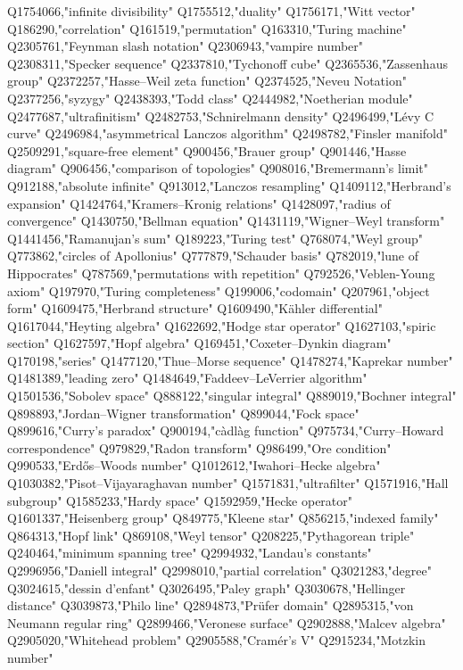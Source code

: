 Q1754066,"infinite divisibility"
Q1755512,"duality"
Q1756171,"Witt vector"
Q186290,"correlation"
Q161519,"permutation"
Q163310,"Turing machine"
Q2305761,"Feynman slash notation"
Q2306943,"vampire number"
Q2308311,"Specker sequence"
Q2337810,"Tychonoff cube"
Q2365536,"Zassenhaus group"
Q2372257,"Hasse–Weil zeta function"
Q2374525,"Neveu Notation"
Q2377256,"syzygy"
Q2438393,"Todd class"
Q2444982,"Noetherian module"
Q2477687,"ultrafinitism"
Q2482753,"Schnirelmann density"
Q2496499,"Lévy C curve"
Q2496984,"asymmetrical Lanczos algorithm"
Q2498782,"Finsler manifold"
Q2509291,"square-free element"
Q900456,"Brauer group"
Q901446,"Hasse diagram"
Q906456,"comparison of topologies"
Q908016,"Bremermann's limit"
Q912188,"absolute infinite"
Q913012,"Lanczos resampling"
Q1409112,"Herbrand's expansion"
Q1424764,"Kramers–Kronig relations"
Q1428097,"radius of convergence"
Q1430750,"Bellman equation"
Q1431119,"Wigner–Weyl transform"
Q1441456,"Ramanujan's sum"
Q189223,"Turing test"
Q768074,"Weyl group"
Q773862,"circles of Apollonius"
Q777879,"Schauder basis"
Q782019,"lune of Hippocrates"
Q787569,"permutations with repetition"
Q792526,"Veblen-Young axiom"
Q197970,"Turing completeness"
Q199006,"codomain"
Q207961,"object form"
Q1609475,"Herbrand structure"
Q1609490,"Kähler differential"
Q1617044,"Heyting algebra"
Q1622692,"Hodge star operator"
Q1627103,"spiric section"
Q1627597,"Hopf algebra"
Q169451,"Coxeter–Dynkin diagram"
Q170198,"series"
Q1477120,"Thue–Morse sequence"
Q1478274,"Kaprekar number"
Q1481389,"leading zero"
Q1484649,"Faddeev–LeVerrier algorithm"
Q1501536,"Sobolev space"
Q888122,"singular integral"
Q889019,"Bochner integral"
Q898893,"Jordan–Wigner transformation"
Q899044,"Fock space"
Q899616,"Curry's paradox"
Q900194,"càdlàg function"
Q975734,"Curry–Howard correspondence"
Q979829,"Radon transform"
Q986499,"Ore condition"
Q990533,"Erdős–Woods number"
Q1012612,"Iwahori–Hecke algebra"
Q1030382,"Pisot–Vijayaraghavan number"
Q1571831,"ultrafilter"
Q1571916,"Hall subgroup"
Q1585233,"Hardy space"
Q1592959,"Hecke operator"
Q1601337,"Heisenberg group"
Q849775,"Kleene star"
Q856215,"indexed family"
Q864313,"Hopf link"
Q869108,"Weyl tensor"
Q208225,"Pythagorean triple"
Q240464,"minimum spanning tree"
Q2994932,"Landau's constants"
Q2996956,"Daniell integral"
Q2998010,"partial correlation"
Q3021283,"degree"
Q3024615,"dessin d'enfant"
Q3026495,"Paley graph"
Q3030678,"Hellinger distance"
Q3039873,"Philo line"
Q2894873,"Prüfer domain"
Q2895315,"von Neumann regular ring"
Q2899466,"Veronese surface"
Q2902888,"Malcev algebra"
Q2905020,"Whitehead problem"
Q2905588,"Cramér's V"
Q2915234,"Motzkin number"
